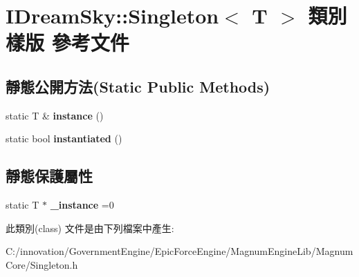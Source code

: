 \hypertarget{class_i_dream_sky_1_1_singleton}{}\section{I\+Dream\+Sky\+:\+:Singleton$<$ T $>$ 類別 樣版 參考文件}
\label{class_i_dream_sky_1_1_singleton}
\subsection*{靜態公開方法(Static Public Methods)}
\begin{DoxyCompactItemize}
\item 
static T \& {\bfseries instance} ()\hypertarget{class_i_dream_sky_1_1_singleton_a29fa654562d6c44006c1f3e52c97323c}{}\label{class_i_dream_sky_1_1_singleton_a29fa654562d6c44006c1f3e52c97323c}

\item 
static bool {\bfseries instantiated} ()\hypertarget{class_i_dream_sky_1_1_singleton_a586a1cda7bcba0539ce9fc72bb68f589}{}\label{class_i_dream_sky_1_1_singleton_a586a1cda7bcba0539ce9fc72bb68f589}

\end{DoxyCompactItemize}
\subsection*{靜態保護屬性}
\begin{DoxyCompactItemize}
\item 
static T $\ast$ {\bfseries \+\_\+instance} =0\hypertarget{class_i_dream_sky_1_1_singleton_a1bd0ba8d204b64566708949e26ecb603}{}\label{class_i_dream_sky_1_1_singleton_a1bd0ba8d204b64566708949e26ecb603}

\end{DoxyCompactItemize}


此類別(class) 文件是由下列檔案中產生\+:\begin{DoxyCompactItemize}
\item 
C\+:/innovation/\+Government\+Engine/\+Epic\+Force\+Engine/\+Magnum\+Engine\+Lib/\+Magnum\+Core/Singleton.\+h\end{DoxyCompactItemize}
